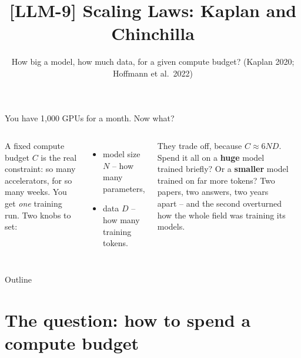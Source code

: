 \documentclass[aspectratio=169]{beamer}
\title{[LLM-9] Scaling Laws: Kaplan and Chinchilla}
\subtitle{How big a model, how much data, for a given compute budget? (Kaplan 2020; Hoffmann et al.\ 2022)}
\date{}
\begin{document}
\begin{frame}{You have 1,000 GPUs for a month. Now what?}
  \begin{columns}[T]
    A fixed compute budget $C$ is the real constraint: so many accelerators, for so many
    weeks. You get \emph{one} training run. Two knobs to set:
    \vskip 6pt
    \begin{itemize}\small
      \item model size $N$ -- how many parameters,
      \item data $D$ -- how many training tokens.
    \end{itemize}
    \vskip 6pt
    They trade off, because $C \approx 6ND$. Spend it all on a \textbf{huge} model trained
    briefly? Or a \textbf{smaller} model trained on far more tokens?
    \vskip 8pt
    Two papers, two answers, two years apart -- and the second overturned how the whole
    field was training its models.
    \begin{center}
    \end{center}
  \end{columns}
\end{frame}

\begin{frame}{Outline}
  \tableofcontents
\end{frame}

\section{The question: how to spend a compute budget}
\end{document}
